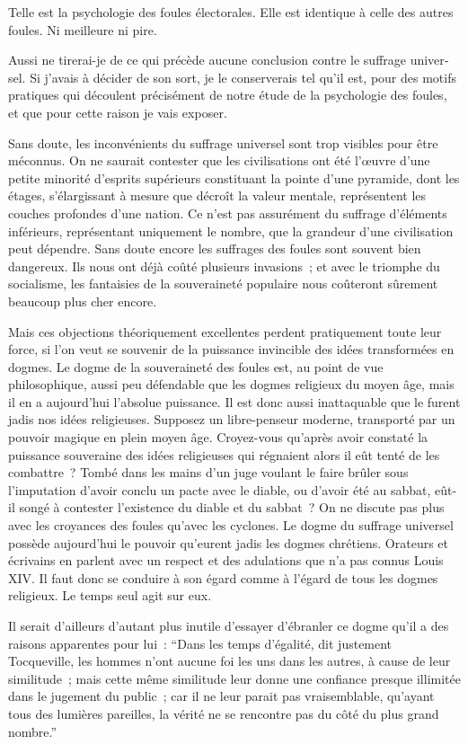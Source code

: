 \documentclass[french,twoside]{book} %
\begin{document}
Telle est la psychologie des foules électorales. Elle est identique à celle des autres foules. Ni meilleure ni pire.\par
Aussi ne tirerai-je de ce qui précède aucune conclusion contre le suffrage univer­sel. Si j’avais à décider de son sort, je le conserverais tel qu’il est, pour des motifs pratiques qui découlent précisément de notre étude de la psychologie des foules, et que pour cette raison je vais exposer.\par
Sans doute, les inconvénients du suffrage universel sont trop visibles pour être méconnus. On ne saurait contester que les civilisations ont été l’œuvre d’une petite minorité d’esprits supérieurs constituant la pointe d’une pyramide, dont les étages, s’élargissant à mesure que décroît la valeur mentale, représentent les couches profon­des d’une nation. Ce n’est pas assurément du suffrage d’éléments inférieurs, représen­tant uniquement le nombre, que la grandeur d’une civilisation peut dépendre. Sans doute encore les suffrages des foules sont souvent bien dangereux. Ils nous ont déjà coûté plusieurs invasions ; et avec le triomphe du socialisme, les fantaisies de la souveraineté populaire nous coûteront sûrement beaucoup plus cher encore.\par
Mais ces objections théoriquement excellentes perdent pratiquement toute leur force, si l’on veut se souvenir de la puissance invincible des idées transformées en dogmes. Le dogme de la souveraineté des foules est, au point de vue philosophique, aussi peu défendable que les dogmes religieux du moyen âge, mais il en a aujourd’hui l’absolue puissance. Il est donc aussi inattaquable que le furent jadis nos idées reli­gieuses. Supposez un libre-penseur moderne, transporté par un pouvoir magique en plein moyen âge. Croyez-vous qu’après avoir constaté la puissance souveraine des idées religieuses qui régnaient alors il eût tenté de les combattre ? Tombé dans les mains d’un juge voulant le faire brûler sous l’imputation d’avoir conclu un pacte avec le diable, ou d’avoir été au sabbat, eût-il songé à contester l’existence du diable et du sabbat ? On ne discute pas plus avec les croyances des foules qu’avec les cyclones. Le dogme du suffrage universel possède aujourd’hui le pouvoir qu’eurent jadis les dogmes chrétiens. Orateurs et écrivains en parlent avec un respect et des adulations que n’a pas connus Louis XIV. Il faut donc se conduire à son égard comme à l’égard de tous les dogmes religieux. Le temps seul agit sur eux.\par
Il serait d’ailleurs d’autant plus inutile d’essayer d’ébranler ce dogme qu’il a des raisons apparentes pour lui : “Dans les temps d’égalité, dit justement Tocqueville, les hommes n’ont aucune foi les uns dans les autres, à cause de leur similitude ; mais cette même similitude leur donne une confiance presque illimitée dans le jugement du public ; car il ne leur parait pas vraisemblable, qu’ayant tous des lumières pareilles, la vérité ne se rencontre pas du côté du plus grand nombre.”\par
\end{document}
